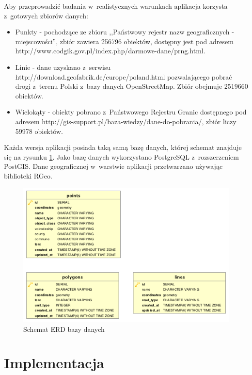 \documentclass[printmode]{mgr}
\begin{document}
Aby przeprowadzić badania w~realistycznych warunkach aplikacja korzysta z~gotowych zbiorów danych:
\begin{itemize}
  \item Punkty - pochodzące ze zbioru ,,Państwowy rejestr nazw geograficznych - miejscowości'', zbiór zawiera 256796 obiektów, dostępny jest pod adresem \\http://www.codgik.gov.pl/index.php/darmowe-dane/prng.html.
  \item Linie - dane uzyskano z~serwisu http://download.geofabrik.de/europe/poland.html pozwalającego pobrać drogi z~terenu Polski z~bazy danych OpenStreetMap. Zbiór obejmuje 2519660 obiektów.
  \item Wielokąty - obiekty pobrano z~Państwowego Rejestru Granic dostępnego pod adresem http://gis-support.pl/baza-wiedzy/dane-do-pobrania/, zbiór liczy 59978 obiektów.
\end{itemize}

Każda wersja aplikacji posiada taką samą bazę danych, której schemat znajduje się na rysunku \ref{fig:erd}. Jako bazę danych wykorzystano PostgreSQL z~rozszerzeniem PostGIS. Dane geograficznej w~warstwie aplikacji przetwarzano używając biblioteki RGeo.

\begin{figure}[H]
  \centering
  \includegraphics[width=1\linewidth]{pictures/erd}
  \caption{Schemat ERD bazy danych}
  \label{fig:erd}
\end{figure}

\section{Implementacja}
\end{document}
